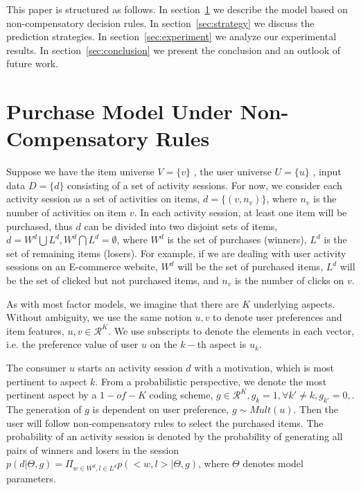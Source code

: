\documentclass[sigconf]{acmart}
\begin{document}

This paper is structured as follows. In section~\ref{sec:model} we describe the model based on non-compensatory decision rules. In section~\ref{sec:strategy} we discuss the prediction strategies. In section~\ref{sec:experiment} we analyze our experimental results. In section~\ref{sec:conclusion} we present the conclusion and an outlook of future work.

\section{Purchase Model Under Non-Compensatory Rules}\label{sec:model}

Suppose we have the item universe $V=\{v\}$ , the user universe $U=\{u\}$ , input data $D=\{d\}$ consisting of a set of activity sessions. For now, we consider each activity session as a set of activities on items, $d=\{(v,n_v)\}$, where $n_v$ is the number of activities on item $v$.  In each activity session, at least one item will be purchased, thus $d$ can be divided into two disjoint sets of items, $d=W^d\bigcup L^d, W^d\bigcap L^d=\emptyset$, where $W^d$ is the set of purchases (winners), $L^d$ is the set of remaining items (losers). For example, if we are dealing with user activity sessions on an E-commerce website, $W^d$ will be the set of purchased items, $L^d$ will be the set of clicked but not purchased items, and $n_v$ is the number of clicks on $v$.


As with most factor models, we imagine that there are $K$ underlying aspects.  Without ambiguity, we use the same notion $u,v$ to denote user preferences and item features, $u,v\in \mathcal{R}^K$. We use subscripts to denote the elements in each vector, i.e. the preference value of user $u$ on the $k-$th aspect is $u_k$. 


The consumer $u$ starts an activity session $d$ with a motivation, which is most pertinent to aspect $k$. From a probabilistic perspective, we denote the most pertinent aspect by a $1-of-K$ coding scheme, $g\in \mathcal{R}^K, g_k=1,\forall k'\neq k, g_{k'}=0,$. The generation of $g$ is dependent on user preference, $g \sim Mult(u)$. Then the user will follow non-compensatory rules to select the purchased items. The probability of an activity session is denoted by the probability of generating all pairs of winners and losers in the session $p(d|\Theta, g)=\Pi_{w\in W^d, l \in L^d} p(<w,l>|\Theta,g)$, where $\Theta$ denotes model parameters. 
\end{document}
